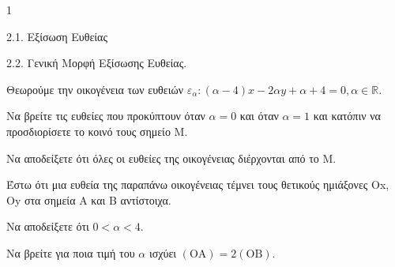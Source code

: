 \begin{ylh}{1}
    \item 2.1. Εξίσωση Ευθείας
    \item 2.2. Γενική Μορφή Εξίσωσης Ευθείας.
\end{ylh}
Θεωρούμε την οικογένεια των ευθειών $\varepsilon_\alpha : (\alpha-4)x - 2\alpha y + \alpha + 4 = 0, \alpha \in \mathbb{R}.$
\begin{alist}
\item Να βρείτε τις ευθείες που προκύπτουν όταν $\alpha=0$ και όταν $\alpha=1$ και κατόπιν να προσδιορίσετε το κοινό τους σημείο M. 
\item Να αποδείξετε ότι όλες οι ευθείες της οικογένειας διέρχονται από το M. 
\item Έστω ότι μια ευθεία της παραπάνω οικογένειας τέμνει τους θετικούς ημιάξονες Ox, Oy στα σημεία A και B αντίστοιχα.
\begin{rlist}
\item Να αποδείξετε ότι $0 < \alpha < 4$. 
\item Να βρείτε για ποια τιμή του $\alpha$ ισχύει $(\text{OA}) = 2(\text{OB})$. 
\end{rlist}
\end{alist}